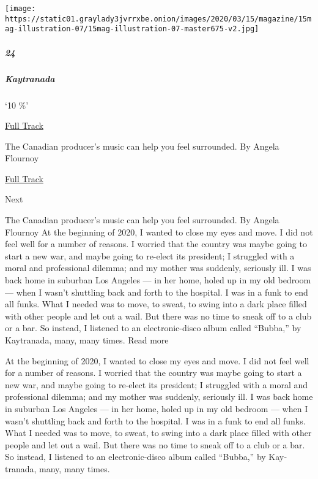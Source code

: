 \texttt{[image: https://static01.graylady3jvrrxbe.onion/images/2020/03/15/magazine/15mag-illustration-07/15mag-illustration-07-master675-v2.jpg]}

\hypertarget{24}{%
\subparagraph{24}\label{24}}

\hypertarget{kaytranada}{%
\subparagraph{Kaytranada}\label{kaytranada}}

`10 \%'

\href{https://open.spotify.com/track/41SwdQIX8Hy2u6fuEDgvWr?si=iBwFWhC1QzuhIiBvdv9D3w}{
Full Track}

The Canadian producer's music can help you feel surrounded. By Angela
Flournoy

\href{https://open.spotify.com/track/41SwdQIX8Hy2u6fuEDgvWr?si=iBwFWhC1QzuhIiBvdv9D3w}{Full
Track }

Next

The Canadian producer's music can help you feel surrounded. By Angela
Flournoy At the beginning of 2020, I wanted to close my eyes and move. I
did not feel well for a number of reasons. I worried that the country
was maybe going to start a new war, and maybe going to re-elect its
president; I struggled with a moral and professional dilemma; and my
mother was suddenly, seriously ill. I was back home in suburban Los
Angeles --- in her home, holed up in my old bedroom --- when I wasn't
shuttling back and forth to the hospital. I was in a funk to end all
funks. What I needed was to move, to sweat, to swing into a dark place
filled with other people and let out a wail. But there was no time to
sneak off to a club or a bar. So instead, I listened to an
electronic-disco album called ``Bubba,'' by Kay­tranada, many, many
times. Read more

At the beginning of 2020, I wanted to close my eyes and move. I did not
feel well for a number of reasons. I worried that the country was maybe
going to start a new war, and maybe going to re-elect its president; I
struggled with a moral and professional dilemma; and my mother was
suddenly, seriously ill. I was back home in suburban Los Angeles --- in
her home, holed up in my old bedroom --- when I wasn't shuttling back
and forth to the hospital. I was in a funk to end all funks. What I
needed was to move, to sweat, to swing into a dark place filled with
other people and let out a wail. But there was no time to sneak off to a
club or a bar. So instead, I listened to an electronic-disco album
called ``Bubba,'' by Kay­tranada, many, many times.

